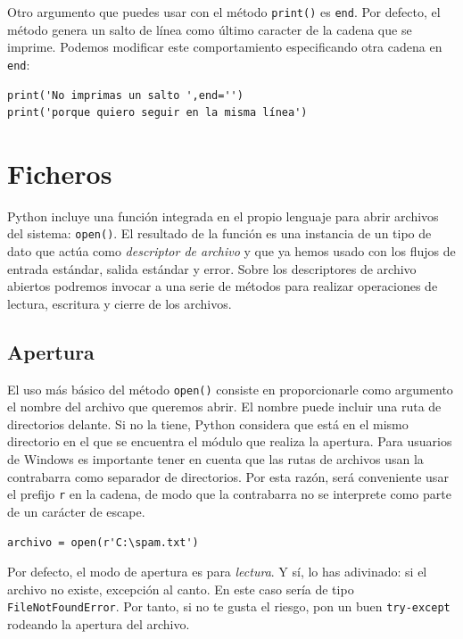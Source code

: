 Otro argumento que puedes usar con el método \texttt{print()} es \texttt{end}. Por defecto, el método genera un salto de línea como último caracter de la cadena que se imprime. Podemos modificar este comportamiento especificando otra cadena en \texttt{end}:

\begin{lstlisting}
print('No imprimas un salto ',end='')
print('porque quiero seguir en la misma línea')
\end{lstlisting}


\section{Ficheros}

Python incluye una función integrada en el propio lenguaje para abrir archivos del sistema: \texttt{open()}. El resultado de la función es una instancia de un tipo de dato que actúa como \emph{descriptor de archivo} y que ya hemos usado con los flujos de entrada estándar, salida estándar y error. Sobre los descriptores de archivo abiertos podremos invocar a una serie de métodos para realizar operaciones de lectura, escritura y cierre de los archivos.

\subsection{Apertura}

El uso más básico del método \texttt{open()} consiste en proporcionarle como argumento el nombre del archivo que queremos abrir. El nombre puede incluir una ruta de directorios delante. Si no la tiene, Python considera que está en el mismo directorio en el que se encuentra el módulo que realiza la apertura. Para usuarios de Windows es importante tener en cuenta que las rutas de archivos usan la contrabarra como separador de directorios. Por esta razón, será conveniente usar el prefijo \texttt{r} en la cadena, de modo que la contrabarra no se interprete como parte de un carácter de escape.

\begin{lstlisting}
archivo = open(r'C:\spam.txt')	
\end{lstlisting}

Por defecto, el modo de apertura es para \emph{lectura}. Y sí, lo has adivinado: si el archivo no existe, excepción al canto. En este caso sería de tipo \texttt{FileNotFoundError}. Por tanto, si no te gusta el riesgo, pon un buen \texttt{try-except} rodeando la apertura del archivo.

